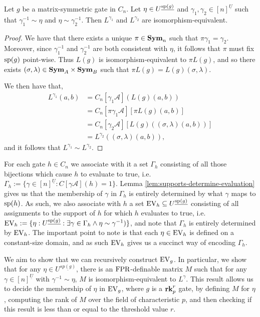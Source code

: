 \documentclass[../paper.tex]{subfiles}
\begin{document}
\begin{lem}
  Let $g$ be a matrix-symmetric gate in $C_n$. Let $\eta \in
  U^{\underline{\text{sp}(g)}}$ and $\gamma_1, \gamma_2 \in [n]^{\underline{U}}$
  such that $\gamma^{-1}_1 \sim \eta$ and $\eta \sim \gamma^{-1}_2$. Then
  $L^{\gamma_1}$ and $L^{\gamma_2}$ are isomorphism-equivalent.
  \label{lem:support-determines-evaluation}
\end{lem}

\begin{proof}
  We have that there exists a unique $\pi \in \text{\textbf{Sym}}_n$ such that $\pi \gamma_1 =
  \gamma_2$. Moreover, since $\gamma^{-1}_1$ and $\gamma^{-1}_2$ are both
  consistent with $\eta$, it follows that $\pi$ must fix $\text{sp}(g)$ point-wise.
  Thus $L(g)$ is isomorphism-equivalent to $\pi L(g)$, and so there exists
  $(\sigma, \lambda) \in \text{\textbf{Sym}}_A \times \text{\textbf{Sym}}_B$ such that $\pi L(g) = L(g)
  (\sigma, \lambda)$.

  We then have that,
  \begin{align*}
    L^{\gamma_1} (a,b) &= C_n[\gamma_1 \mathcal{A}](L(g)(a,b))\\
                       & = C_n[\pi \gamma_1 \mathcal{A}][\pi L(g)(a,b)] \\
                       & = C_n[\gamma_2 \mathcal{A}][L(g)((\sigma, \lambda)(a,b))]\\
                       & = L^{\gamma_2} ((\sigma, \lambda) (a,b)),
  \end{align*}
  and it follows that $L^{\gamma_1} \sim L^{\gamma_2}$.
\end{proof}

For each gate $h \in C_n$ we associate with it a set $\Gamma_h$ consisting of
all those bijections which cause $h$ to evaluate to true, i.e. $\Gamma_h:=
\{\gamma \in [n]^{\underline{U}} : C[\gamma \mathcal{A}](h) = 1 \}$. Lemma
\ref{lem:supports-determine-evaluation} gives us that the membership of $\gamma$
in $\Gamma_h$ is entirely determined by what $\gamma$ maps to $\text{sp}(h)$. As
such, we also associate with $h$ a set $\text{EV}_h \subseteq
U^{\underline{\text{sp}(g)}}$ consisting of all assignments to the support of $h$
for which $h$ evaluates to true, i.e. $\text{EV}_h := \{ \eta:
U^{\underline{\text{sp}(g)}} : \exists \gamma \in \Gamma_h \wedge \eta \sim
\gamma^{-1})\}$, and note that $\Gamma_h$ is entirely determined by $\text{EV}_h$. The
important point to note is that each $\eta \in \text{EV}_h$ is defined on a
constant-size domain, and as such $\text{EV}_h$ gives us a succinct way of encoding
$\Gamma_h$.

We aim to show that we can recursively construct $\text{EV}_g$. In particular, we show
that for any $\eta \in U^{\underline{sp(g)}}$, there is an $\text{\upshape FPR}$-definable
matrix $M$ such that for any $\gamma \in [n]^{\underline{U}}$ with $\gamma^{-1}
\sim \eta$, $M$ is isomorphism-equivalent to $L^{\gamma}$. This result allows us
to decide the membership of $\eta$ in $\text{EV}_g$, where $g$ is a $\text{\textbf{rk}}^r_p$ gate,
by defining $M$ for $\eta$, computing the rank of $M$ over the field of
characteristic $p$, and then checking if this result is less than or equal to
the threshold value $r$.
\end{document}
